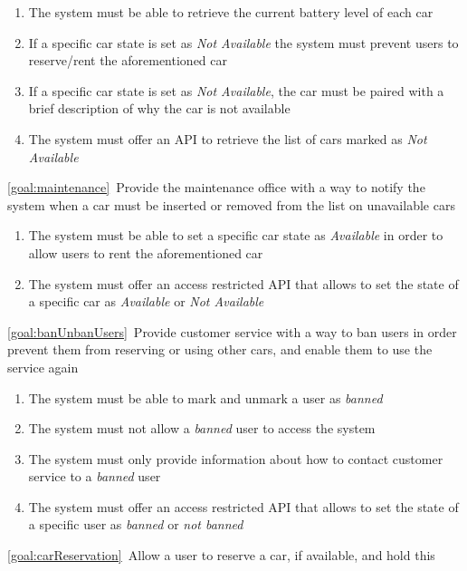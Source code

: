 \begin{description}
\begin{enumerate}[resume*]
   				\item The system must be able to retrieve the current battery level of each car
   				\item If a specific car state is set as \emph{Not Available} the system must 
   				prevent users to reserve/rent the aforementioned car
   				\item If a specific car state is set as \emph{Not Available}, the car must be paired with
   				a brief description of why the car is not available
   				\item The system must offer an API  to retrieve the list of cars marked as \emph{Not Available}
  			\end{enumerate}
		\item \ref{goal:maintenance}\ Provide the maintenance office with a way to notify the
		system when a car must be inserted or removed from the list on unavailable cars
			\begin{enumerate}[resume*]
   				\item The system must be able to set a specific car state as \emph{Available} in order 
   				to allow users to rent the aforementioned car
   				\item The system must offer an access restricted API  that allows
   				to set the state of a specific car as \emph{Available} or \emph{Not Available}
  			\end{enumerate}
  		\item \ref{goal:banUnbanUsers}\ Provide customer service with a way to ban users in order
  		prevent them from reserving or using other cars, and enable them to use the service again
  			\begin{enumerate}[resume*]
  				\item The system must be able to mark and unmark a user as \emph{banned}
  				\item The system must not allow a \emph{banned} user to access the system
   				\item The system must only provide information about how to contact customer
   				service to a \emph{banned} user
   				\item The system must offer an access restricted API that allows to set the state of a
   				specific user as \emph{banned} or \emph{not banned}
   			\end{enumerate}
 	  	\item \ref{goal:carReservation}\ Allow a user to reserve a car, if available, and hold this

\end{description}
